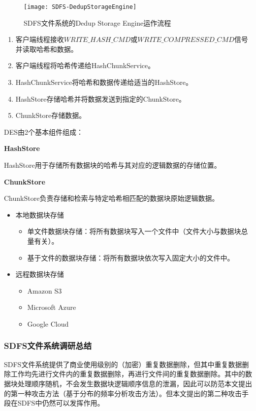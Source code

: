 \begin{figure}[!htb]
    \small
    \centering
    \texttt{[image: SDFS-DedupStorageEngine]}
    \caption{SDFS文件系统的Dedup Storage Engine运作流程} 
    \label{fig:SDFS-DedupStorageEngine}
\end{figure}

\begin{enumerate}
    \item 客户端线程接收$WRITE\_HASH\_CMD$或$WRITE\_COMPRESSED\_CMD$信号并读取哈希和数据。
    \item 客户端线程将哈希传递给HashChunkService。
    \item HashChunkService将哈希和数据传递给适当的HashStore。
    \item HashStore存储哈希并将数据发送到指定的ChunkStore。
    \item ChunkStore存储数据。
\end{enumerate}

DES由2个基本组件组成：

\textbf{HashStore}

HashStore用于存储所有数据块的哈希与其对应的逻辑数据的存储位置。

\textbf{ChunkStore}

ChunkStore负责存储和检索与特定哈希相匹配的数据块原始逻辑数据。

\begin{itemize}
    \item 本地数据块存储
    \begin{itemize}
        \item 单文件数据块存储：将所有数据块写入一个文件中（文件大小与数据块总量有关）。
        \item 基于文件的数据块存储：将所有数据块依次写入固定大小的文件中。
    \end{itemize}
    \item 远程数据块存储
    \begin{itemize}
        \item Amazon S3
        \item Microsoft Azure
        \item Google Cloud
    \end{itemize}
\end{itemize}

\subsubsection{SDFS文件系统调研总结}

SDFS文件系统提供了商业使用级别的（加密）重复数据删除，但其中重复数据删除工作均先进行文件内的重复数据删除，再进行文件间的重复数据删除。其中的数据块处理顺序随机，不会发生数据块逻辑顺序信息的泄漏，因此可以防范本文提出的第一种攻击方法（基于分布的频率分析攻击方法）。但本文提出的第二种攻击手段在SDFS中仍然可以发挥作用。

